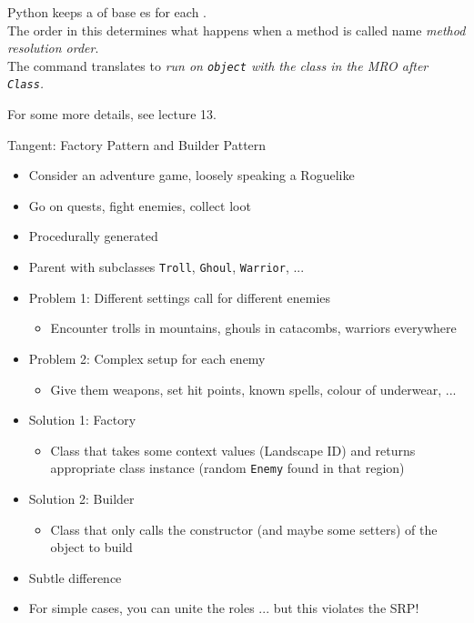 
\begin{frame}
%
\begin{recapbox}
Python keeps a  of base es for each . \\
The order in this  determines what happens when a method is called \Thus name \emph{method resolution order}. \\
The command  translates to \emph{run on \texttt{object} with the class in the MRO \emph{after} \texttt{Class}.}

\vspace{3pt}
For some more details, see lecture 13.
\end{recapbox}
%
\end{frame}


\begin{frame}{Tangent: Factory Pattern and Builder Pattern}
%
\begin{itemize}
\item Consider an adventure game, loosely speaking a Roguelike
\item Go on quests, fight enemies, collect loot
\item Procedurally generated
	\pause
\item Parent  with subclasses \texttt{Troll}, \texttt{Ghoul}, \texttt{Warrior}, ...
\item Problem 1: Different settings call for different enemies
	\begin{itemize}
	\item Encounter trolls in mountains, ghouls in catacombs, warriors everywhere
	\end{itemize}
\item Problem 2: Complex setup for each enemy
	\begin{itemize}
	\item Give them weapons, set hit points, known spells, colour of underwear, ...
	\end{itemize}
	\pause
\item Solution 1: Factory
	\begin{itemize}
	\item Class that takes some context values (\zB Landscape ID) and returns appropriate class instance (\zB random \texttt{Enemy} found in that region)
	\end{itemize}
	\pause
\item Solution 2: Builder
	\begin{itemize}
	\item Class that only calls the constructor (and maybe some setters) of the object to build
	\end{itemize}
	\pause
\item Subtle difference
\item For simple cases, you can unite the roles ... but this violates the SRP!
\end{itemize}
%
\end{frame}

